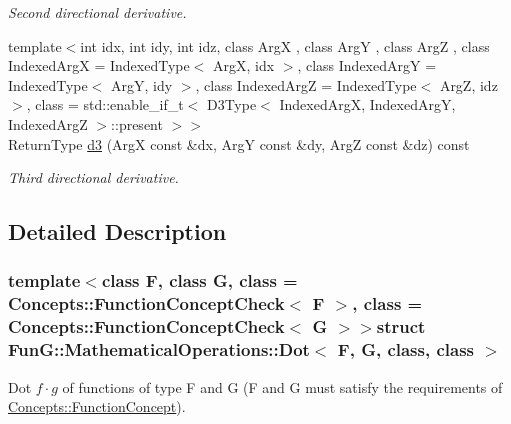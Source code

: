 \begin{DoxyCompactItemize}
\begin{DoxyCompactList}\small\item\em Second directional derivative. \end{DoxyCompactList}\item 
{\footnotesize template$<$int idx, int idy, int idz, class Arg\-X , class Arg\-Y , class Arg\-Z , class Indexed\-Arg\-X  = Indexed\-Type$<$ Arg\-X, idx $>$, class Indexed\-Arg\-Y  = Indexed\-Type$<$ Arg\-Y, idy $>$, class Indexed\-Arg\-Z  = Indexed\-Type$<$ Arg\-Z, idz $>$, class  = std\-::enable\-\_\-if\-\_\-t$<$                           D3\-Type$<$ Indexed\-Arg\-X, Indexed\-Arg\-Y, Indexed\-Arg\-Z $>$\-::present $>$$>$ }\\Return\-Type \hyperlink{structFunG_1_1MathematicalOperations_1_1Dot_a1fe7dc4596f532e9568e48945c07d00b}{d3} (Arg\-X const \&dx, Arg\-Y const \&dy, Arg\-Z const \&dz) const 
\begin{DoxyCompactList}\small\item\em Third directional derivative. \end{DoxyCompactList}\end{DoxyCompactItemize}


\subsection{Detailed Description}
\subsubsection*{template$<$class F, class G, class = Concepts\-::\-Function\-Concept\-Check$<$ F $>$, class = Concepts\-::\-Function\-Concept\-Check$<$ G $>$$>$struct Fun\-G\-::\-Mathematical\-Operations\-::\-Dot$<$ F, G, class, class $>$}

Dot $f \cdot g$ of functions of type F and G (F and G must satisfy the requirements of \hyperlink{structFunG_1_1Concepts_1_1FunctionConcept}{Concepts\-::\-Function\-Concept}). 

